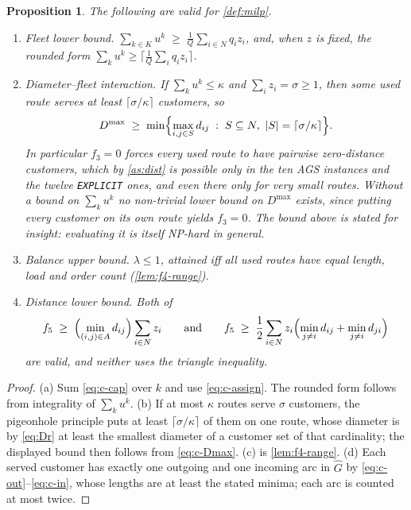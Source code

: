 \documentclass[11pt,a4paper]{article}
\theoremstyle{definition}
\theoremstyle{plain}
\newtheorem{proposition}[definition]{Proposition}
\newcommand{\Arcs}{A}
\newcommand{\Cust}{N}
\newcommand{\Veh}{K}
\newcommand{\Dmax}{D^{\max}}
\begin{document}
\begin{proposition}
\label{prop:bounds}
The following are valid for \cref{def:milp}.
\begin{enumerate}[label=(\alph*),leftmargin=*]
\item \emph{Fleet lower bound.}
  $\sum_{k \in \Veh} u^k \;\ge\; \frac{1}{Q}\sum_{i \in \Cust} q_i z_i$,
  and, when $z$ is fixed, the rounded form
  $\sum_k u^k \ge \bigl\lceil \frac{1}{Q}\sum_i q_i z_i \bigr\rceil$.
\item \emph{Diameter--fleet interaction.}  If $\sum_{k} u^k \le \kappa$ and
  $\sum_{i} z_i = \sigma \ge 1$, then some used route serves at least
  $\lceil \sigma/\kappa \rceil$ customers, so
  \[
    \Dmax \;\ge\;
    \min\Bigl\{ \max_{i,j \in S} d_{ij} \;:\;
      S \subseteq \Cust,\ |S| = \lceil \sigma/\kappa \rceil \Bigr\} .
  \]
  In particular $f_3 = 0$ forces every used route to have pairwise
  zero-distance customers, which by \cref{as:dist} is possible only in the ten
  \textsf{AGS} instances and the twelve \texttt{EXPLICIT} ones, and even there
  only for very small routes.  Without a bound on $\sum_k u^k$ no non-trivial
  lower bound on $\Dmax$ exists, since putting every customer on its own route
  yields $f_3 = 0$.  The bound above is stated for insight: evaluating it is
  itself NP-hard in general.
\item \emph{Balance upper bound.}  $\lambda \le 1$, attained iff all used routes
  have equal length, load and order count (\cref{lem:f4-range}).
\item \emph{Distance lower bound.}  Both of
  \[
    f_5 \;\ge\; \Bigl( \min_{(i,j)\in\Arcs} d_{ij} \Bigr)
                \sum_{i \in \Cust} z_i
    \qquad\text{and}\qquad
    f_5 \;\ge\; \frac{1}{2}\sum_{i\in\Cust} z_i
      \Bigl( \min_{j \ne i} d_{ij} + \min_{j \ne i} d_{ji} \Bigr)
  \]
  are valid, and neither uses the triangle inequality.
\end{enumerate}
\end{proposition}

\begin{proof}
(a) Sum \eqref{eq:c-cap} over $k$ and use \eqref{eq:c-assign}.  The rounded form
follows from integrality of $\sum_k u^k$.  (b) If at most $\kappa$ routes serve
$\sigma$ customers, the pigeonhole principle puts at least
$\lceil \sigma/\kappa \rceil$ of them on one route, whose diameter is by
\eqref{eq:Dr} at least the smallest diameter of a customer set of that
cardinality; the displayed bound then follows from \eqref{eq:c-Dmax}.  (c) is
\cref{lem:f4-range}.  (d) Each served customer has exactly one outgoing and one
incoming arc in $\widehat{G}$ by \eqref{eq:c-out}--\eqref{eq:c-in}, whose lengths
are at least the stated minima; each arc is counted at most twice.
\end{proof}
\end{document}
